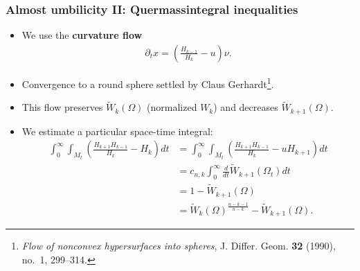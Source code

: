 \documentclass{beamer}
\newcommand{\ti}{\tilde}
\newcommand{\cn}{\colon}
\newcommand{\bbR}{\mathbb{R}}
\newcommand{\bbS}{\mathbb{S}}
\newcommand{\8}{\infty}
\newcommand{\Om}{\Omega}
\newcommand{\del}{\partial}
\newcommand{\fr}[2]{\frac{#1}{#2}}
\newcommand{\x}{\times}
\newcommand{\eq}[1]{\begin{equation}\begin{alignedat}{2} #1 \end{alignedat}\end{equation}}
\newcommand{\br}[1]{\left(#1\right)}
\newcommand{\ra}{\rightarrow}
\begin{document}
\begin{frame} 
\frametitle{Almost umbilicity II: Quermassintegral inequalities}
\begin{itemize}
	\item[] We use the {\bf{curvature flow}}
		\eq{\label{GLF}\del_{t}x=\br{\fr{H_{k-1}}{H_{k}}-u}\nu.}
	\item[] Convergence to a round sphere settled by Claus Gerhardt\footnote{\emph{Flow of nonconvex hypersurfaces into spheres}, J. Differ.
  Geom. \textbf{32} (1990), no.~1, 299--314.}.
	\item[] This flow preserves $\ti W_{k}(\Om)$ (normalized $W_{k}$) and decreases $\ti W_{k+1}(\Om)$.
	\item[] We estimate a particular space-time integral:
	\eq{\label{pf:AF-1}\int_{0}^{\8}\int_{M_{t}}\br{\fr{H_{k+1}H_{k-1}}{H_{k}}-H_{k}}dt&=\int_{0}^{\8}\int_{M_{t}}\br{\fr{H_{k+1}H_{k-1}}{H_{k}}-uH_{k+1}}dt\\
					&=c_{n,k}\int_{0}^{\8}\fr{d}{dt}\ti W_{k+1}(\Om_{t})dt\\
					&=1-\ti W_{k+1}(\Om)\\
					&=\ti{W}_{k}(\Om)^{\fr{n-k-1}{n-k}}-\ti W_{k+1}(\Om).
}
\end{itemize}
\end{frame}
%
\end{document}
